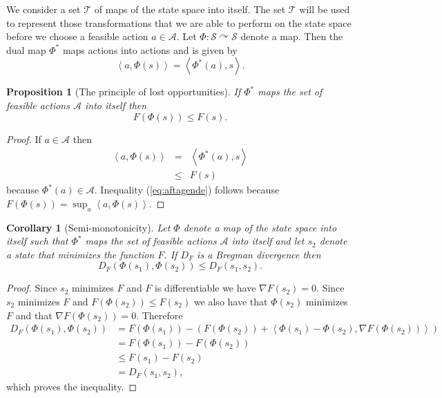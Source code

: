 \documentclass[10pt,a4paper,draft]{article}
\newtheorem{Prop}{Proposition}
\newtheorem{cor}{Corollary}
\begin{document}
We consider a set $\mathcal{T}$ of maps
of the state space into itself. The set $\mathcal{T}$ will be used to
represent those transformations
that we are able to perform on the state space before we choose
a feasible action $a\in\mathcal{A}$. Let
$\Phi:\mathcal{S}\curvearrowright\mathcal{S}$
denote a map. Then the dual map $\Phi^*$ maps actions into actions and is given by
\[
\left\langle a,\Phi\left(s\right)\right\rangle  = 
\left\langle \Phi^* (a),s\right\rangle .
\]
\begin{Prop}[The principle of lost opportunities]\label{prop:lostoppotunities}
If $\Phi^*$ maps the set of feasible actions $\mathcal{A}$  into itself then 
\begin{equation}
F\left(\Phi\left(s\right)\right)\leq
F\left(s\right).\label{eq:aftagende}
\end{equation}
 
\end{Prop}
\begin{proof}
If $a\in\mathcal{A}$  then 
\begin{eqnarray*}
\left\langle a,\Phi\left(s\right)\right\rangle & = &
\left\langle \Phi^*(a),s\right\rangle \\
 & \leq & F\left(s\right)
\end{eqnarray*}
because $\Phi^*(a)\in\mathcal{A}$. Inequality
(\ref{eq:aftagende}) follows because
$F\left(\Phi\left(s\right)\right)=\sup_{a}\left\langle
a,\Phi\left(s\right)\right\rangle .$
\end{proof}

\begin{cor}[Semi-monotonicity]
Let $\Phi$ denote a map of the state space into itself such that $\Phi^*$ maps the set of feasible actions $\mathcal{A}$ into itself and let $s_{2}$
denote
a state that minimizes the function $F$. If $D_{F}$ is a Bregman divergence then 
\begin{equation}
D_{F}\left(\Phi\left(s_{1}\right),\Phi\left(s_{2}\right)\right)\leq
D_{F}\left(s_{1},s_{2}\right).\label{eq:aftagende-1}
\end{equation}
\end{cor}

\begin{proof}
Since $s_{2}$ minimizes $F$ and $F$ is differentiable we have
$\nabla F\left(s_{2}\right)=0$.
Since $s_{2}$ minimizes $F$ and
$F\left(\Phi\left(s_{2}\right)\right)\leq F\left(s_{2}\right)$
we also have that $\Phi\left(s_{2}\right)$ minimizes $F$ and
that
$\nabla F\left(\Phi\left(s_{2}\right)\right)=0$. Therefore 
\begin{align*}
D_{F}\left(\Phi\left(s_{1}\right),\Phi\left(s_{2}\right)\right)
&
=F\left(\Phi\left(s_{1}\right)\right)-\left(F\left(\Phi\left(s_{2}\right)\right)+\left\langle
\Phi\left(s_{1}\right)-\Phi\left(s_{2}\right),\nabla
F\left(\Phi\left(s_{2}\right)\right)\right\rangle \right)\\
&
=F\left(\Phi\left(s_{1}\right)\right)-F\left(\Phi\left(s_{2}\right)\right)\\
 & \leq F\left(s_{1}\right)-F\left(s_{2}\right)\\
 & =D_{F}\left(s_{1},s_{2}\right),
\end{align*}
which proves the inequality.
\end{proof}
\end{document}
